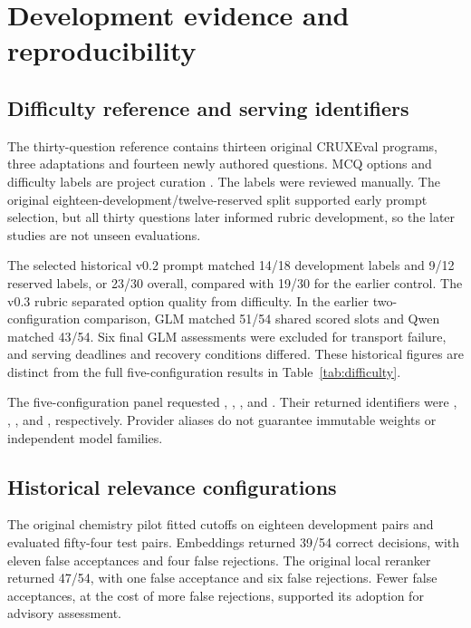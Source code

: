 \clearpage
\setcounter{table}{0}
\renewcommand{\thetable}{B\arabic{table}}
\renewcommand{\theHtable}{B\arabic{table}}
\section{Development evidence and reproducibility}\label{app:history}

\subsection{Difficulty reference and serving identifiers}

The thirty-question reference contains thirteen original CRUXEval programs, three adaptations and fourteen newly authored questions. MCQ options and difficulty labels are project curation \parencite{cruxeval}. The labels were reviewed manually. The original eighteen-development/twelve-reserved split supported early prompt selection, but all thirty questions later informed rubric development, so the later studies are not unseen evaluations.

The selected historical v0.2 prompt matched 14/18 development labels and 9/12 reserved labels, or 23/30 overall, compared with 19/30 for the earlier control. The v0.3 rubric separated option quality from difficulty. In the earlier two-configuration comparison, GLM matched 51/54 shared scored slots and Qwen matched 43/54. Six final GLM assessments were excluded for transport failure, and serving deadlines and recovery conditions differed. These historical figures are distinct from the full five-configuration results in Table~\ref{tab:difficulty}.

The five-configuration panel requested , , ,  and . Their returned identifiers were , , ,  and , respectively. Provider aliases do not guarantee immutable weights or independent model families.

\subsection{Historical relevance configurations}

The original chemistry pilot fitted cutoffs on eighteen development pairs and evaluated fifty-four test pairs. Embeddings returned 39/54 correct decisions, with eleven false acceptances and four false rejections. The original local reranker returned 47/54, with one false acceptance and six false rejections. Fewer false acceptances, at the cost of more false rejections, supported its adoption for advisory assessment.

